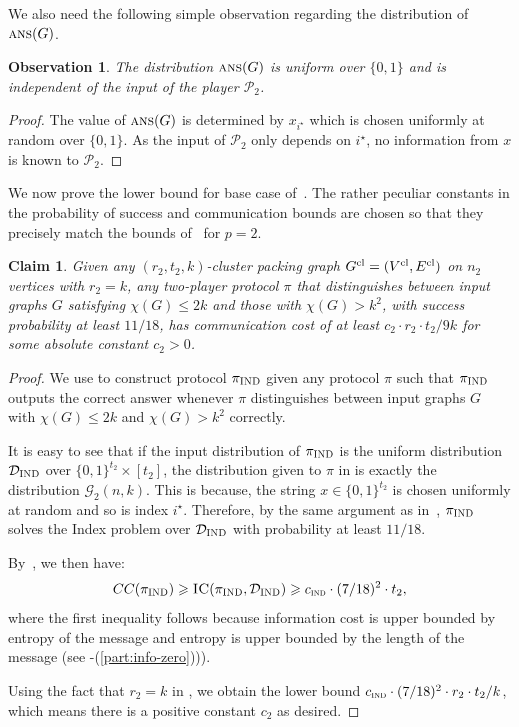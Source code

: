 \documentclass[11pt]{article}
\newtheorem{claim}[lemma]{Claim}
\newtheorem{observation}[lemma]{Observation}
\theoremstyle{definition}
\renewcommand{\leq}{\leqslant}
\renewcommand{\geq}{\geqslant}
\newcommand{\itfacts}[1]{\Cref{fact:it-facts}-(\ref{part:#1})\xspace}
\newcommand{\player}[1]{\ensuremath{\mathcal{P}_{#1}}}
\newcommand{\cG}{\ensuremath{\mathcal{G}}}
\newcommand{\ans}{\ensuremath{\textnormal{\textsc{ans}}}}
\newcommand{\istar}{\ensuremath{i^{\star}}}
\newcommand{\prot}{\ensuremath{\pi}}
\newcommand{\ic}{\ensuremath{\textnormal{\textsc{IC}}}}
\newcommand{\protindex}{\ensuremath{\prot_{\textnormal{\textsc{IND}}}}}
\begin{document}
		We also need the following simple observation regarding the distribution of $\ans(G)$. 
		\begin{observation}\label{obs:2player-ind-prop-1}
			The distribution $\ans(G)$ is uniform over $\{0, 1\}$ and is independent of the input of the player $\player{2}$.
		\end{observation}
		\begin{proof}
			The value of $\ans(G)$ is determined by $x_{\istar}$ which is chosen uniformly at random over $\{0, 1\}$. As the input of $\player{2}$ only depends on $\istar$, no information from $x$ is known to $\player{2}$.
		\end{proof}
		
		We now prove the lower bound for base case of~. The rather peculiar constants in the probability of success and communication bounds are chosen so that they precisely match the bounds of~ 
		for $p=2$. 
		
		\begin{claim}\label{clm:two-player-basecase}
		Given any $(r_2, t_2, k)$-cluster packing graph $G^{\textnormal{cl}} = (V^{\textnormal{cl}}, E^{\textnormal{cl}})$ on $n_2$ vertices with $r_2 = k$, any two-player protocol $\prot$ that distinguishes between input graphs $G$ satisfying $\chi(G) \leq 2k$ and those with $\chi(G) > k^2$, with success probability at least $11/18$, has communication cost of at least $c_2 \cdot r_2 \cdot t_2 / 9k$ for some absolute constant $c_2 > 0$.
		\end{claim}
		\begin{proof}
			We use  to construct protocol $\protindex$ given any protocol $\prot$ such that $\protindex$ outputs the correct answer whenever $\prot$ distinguishes between input graphs $G$ with $\chi(G) \leq 2k$ and $\chi(G) > k^2$  correctly. 
			

			It is easy to see that if the input distribution of $\protindex$ is the uniform distribution $\mathcal{D}_{\textnormal{\textsc{IND}}}$ over $\{0,1\}^{t_2} \times [t_2]$, the distribution given to $\prot$ in  is exactly the distribution $\cG_2(n,k)$. This is because, the string $x \in \{0,1\}^{t_2}$ is chosen uniformly at random and so is index $\istar$. 
			Therefore, by the same argument as in~, $\protindex$ solves the Index problem over $\mathcal{D}_{\textnormal{\textsc{IND}}}$ with probability at least $11/18$.
			
			By~, we then have:
			\[
				CC(\protindex) \geq \ic(\protindex, \cDind ) \geq \cind \cdot (7/18)^2 \cdot t_2,
			\]
			where the first inequality follows because information cost is upper bounded by entropy of the message and entropy is upper bounded by the length of the message (see  \itfacts{info-zero})). 
			
			Using the fact that $r_2 = k$ in , we obtain the lower bound 
			$c_{\textnormal{\textsc{ind}}} \cdot (7/18)^2 \cdot r_2\cdot t_2/k$, which means there is a positive constant $c_2$ as desired.
		\end{proof}		
		
\end{document}
